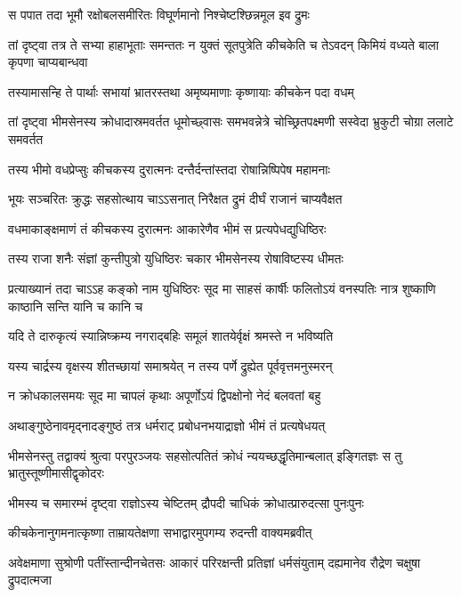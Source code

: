 \twolineshloka
{स पपात तदा भूमौ रक्षोबलसमीरितः}
{विघूर्णमानो निश्चेष्टश्छिन्नमूल इव द्रुमः}


\threelineshloka
{तां दृष्ट्वा तत्र ते सभ्या हाहाभूताः समन्ततः}
{न युक्तं सूतपुत्रेति कीचकेति च तेऽवदन्}
{किमियं वध्यते बाला कृपणा चाप्यबान्धवा}


\twolineshloka
{तस्यामासन्हि ते पार्थाः सभायां भ्रातरस्तथा}
{अमृष्यमाणाः कृष्णायाः कीचकेन पदा वधम्}


\threelineshloka
{तां दृष्ट्वा भीमसेनस्य क्रोधादास्रमवर्तत}
{धूमोच्छ्वासः समभवन्नेत्रे चोच्छ्रितपक्ष्मणी}
{सस्वेदा भ्रुकुटी चोग्रा ललाटे समवर्तत}


\twolineshloka
{तस्य भीमो वधप्रेप्सुः कीचकस्य दुरात्मनः}
{दन्तैर्दन्तांस्तदा रोषान्निष्पिपेष महामनाः}


\twolineshloka
{भूयः सञ्चरितः क्रुद्धः सहसोत्थाय चाऽऽसनात्}
{निरैक्षत द्रुमं दीर्घं राजानं चाप्यवैक्षत}


\twolineshloka
{वधमाकाङ्क्षमाणं तं कीचकस्य दुरात्मनः}
{आकारेणैव भीमं स प्रत्यपेधद्युधिष्ठिरः}


\twolineshloka
{तस्य राजा शनैः संज्ञां कुन्तीपुत्रो युधिष्ठिरः}
{चकार भीमसेनस्य रोषाविष्टस्य धीमतः}


\onelineshloka
{प्रत्याख्यानं तदा चाऽऽह कङ्को नाम युधिष्ठिरः}
\twolineshloka
{सूद मा साहसं कार्षीः फलितोऽयं वनस्पतिः}
{नात्र शुष्काणि काष्ठानि सन्ति यानि च कानि च}


\twolineshloka
{यदि ते दारुकृत्यं स्यान्निष्क्रम्य नगराद्बहिः}
{समूलं शातयेर्वृक्षं श्रमस्ते न भविष्यति}


\twolineshloka
{यस्य चार्द्रस्य वृक्षस्य शीतच्छायां समाश्रयेत्}
{न तस्य पर्णे द्रुह्येत पूर्ववृत्तमनुस्मरन्}


\twolineshloka
{न क्रोधकालसमयः सूद मा चापलं कृथाः}
{अपूर्णोऽयं द्विपक्षोनो नेदं बलवतां बहु}


\twolineshloka
{अथाङ्गुष्ठेनावमृद्नादङ्गुष्ठं तत्र धर्मराट्}
{प्रबोधनभयाद्राज्ञो भीमं तं प्रत्यषेधयत्}


\threelineshloka
{भीमसेनस्तु तद्वाक्यं श्रुत्वा परपुरञ्जयः}
{सहसोत्पतितं क्रोधं न्ययच्छद्धृतिमान्बलात्}
{इङ्गितज्ञः स तु भ्रातुस्तूष्णीमासीद्वृकोदरः}


\twolineshloka
{भीमस्य च समारम्भं दृष्ट्वा राज्ञोऽस्य चेष्टितम्}
{द्रौपदी चाधिकं क्रोधात्प्रारुदत्सा पुनःपुनः}


\twolineshloka
{कीचकेनानुगमनात्कृष्णा ताम्रायतेक्षणा}
{सभाद्वारमुपगम्य रुदन्ती वाक्यमब्रवीत्}


\threelineshloka
{अवेक्षमाणा सुश्रोणी पतींस्तान्दीनचेतसः}
{आकारं परिरक्षन्ती प्रतिज्ञां धर्मसंयुताम्}
{दह्यमानेव रौद्रेण चक्षुषा द्रुपदात्मजा}


